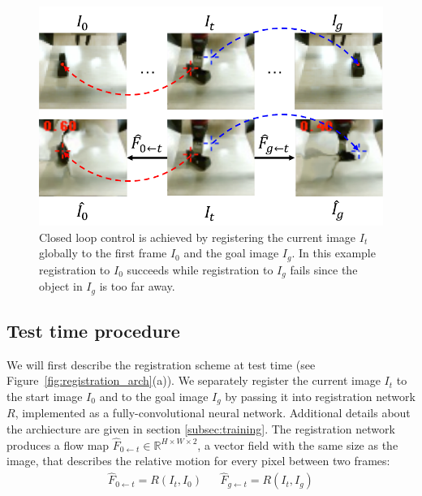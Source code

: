 \begin{figure}
\vspace{-0.25in}
\centering
\includegraphics[width=0.5\columnwidth]{images/registration_singletime.pdf}
\caption{\small{Closed loop control is achieved by registering the current image $I_t$ globally to the first frame $I_0$ and the goal image $I_g$. In this example registration to $I_0$ succeeds while registration to $I_g$ fails since the object in $I_g$ is too far away.}
\label{fig:reg_single}
\vspace{-0.2in}
}
\end{figure}

\subsection{Test time procedure}
 We will first describe the registration scheme at test time (see Figure~\ref{fig:registration_arch}(a)). We separately register the current image $I_t$ to the start image $I_0$ and to the goal image $I_g$ by passing it into registration network $R$, implemented as a fully-convolutional neural network. Additional details about the archiecture are given in section \ref{subsec:training}. The registration network produces a flow map $\hat{F}_{0 \leftarrow t} \in \mathbb{R}^{H \times W \times 2}$, a vector field with the same size as the image, that describes the relative motion for every pixel between two frames:
\begin{align}
    \hat{F}_{0 \leftarrow t} = R(I_t, I_0) &&
    \hat{F}_{g \leftarrow t} = R(I_t, I_g)
\end{align}

